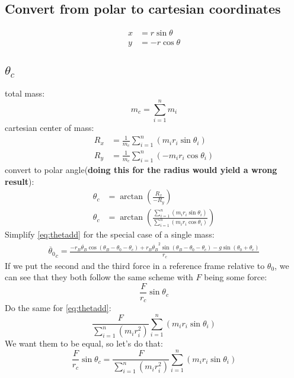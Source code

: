 \documentclass[titlepage]{article}
\numberwithin{equation}{section}
\begin{document}
\subsection{Convert from polar to cartesian coordinates}
\begin{align}
x &= r \sin \theta \\
y &= -r \cos \theta
\end{align}

\subsection{$\theta_c$}
total mass:
\begin{equation}
m_c = \sum_{i=1}^{n}m_i
\end{equation}
cartesian center of mass:
\begin{align}
R_x &= \frac{1}{m_c} \sum_{i=1}^{n}(m_i r_i \sin \theta_i) \\
R_y &= \frac{1}{m_c} \sum_{i=1}^{n}(- m_i r_i \cos \theta_i) 
\end{align}
convert to polar angle(\textbf{doing this for the radius would yield a wrong result}):
\begin{align}
\theta_c &= \arctan{\left(\frac{R_x}{-R_y}\right)} \\
\theta_c &= \arctan{\left(\frac{
    \sum_{i=1}^{n}(m_i r_i \sin \theta_i)
} {
    \sum_{i=1}^{n}(m_i r_i \cos \theta_i)
}\right)}
\end{align}
Simplify \ref{eq:thetadd} for the special case of a single mass:
\begin{align}
\ddot{\theta_0}_c =
    \frac{
        - r_B \ddot{\theta_B} \cos{(\theta_B - \theta_0 - \theta_c)}
        + r_B \dot{\theta_B}^2 \sin{(\theta_B - \theta_0 - \theta_c)}
        - g \sin{(\theta_0 + \theta_c)}
    } {
        r_c
    } \label{eq:theta0cdd}
\end{align}
If we put the second and the third force in a reference frame relative to $\theta_0$, we can see that they both follow the same scheme with $F$ being some force:
\begin{equation}
\frac{F}{r_c} \sin \theta_c
\end{equation}
Do the same for \ref{eq:thetadd}:
\begin{equation}
\frac{F}{\sum_{i=1}^{n}(m_i r_i^2)} \sum_{i=1}^{n}(m_i r_i \sin \theta_i)
\end{equation}
We want them to be equal, so  let's do that:
\begin{equation}
\frac{F}{r_c} \sin \theta_c = 
    \frac{F}{\sum_{i=1}^{n}(m_i r_i^2)} \sum_{i=1}^{n}(m_i r_i \sin \theta_i)
\end{equation}
\end{document}
